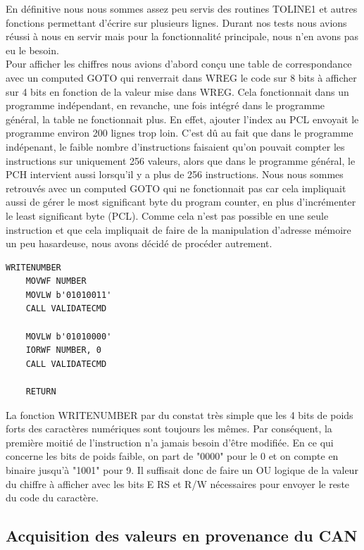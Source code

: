 \documentclass[a4paper,11pt,titlepage]{article}
\begin{document}
En définitive nous nous sommes assez peu servis des routines TOLINE1 et autres fonctions permettant d'écrire sur plusieurs lignes. Durant nos tests nous avions réussi à nous en servir mais pour la fonctionnalité principale, nous n'en avons pas eu le besoin.\\

Pour afficher les chiffres nous avions d'abord conçu une table de correspondance avec un computed GOTO qui renverrait dans WREG le code sur 8 bits à afficher sur 4 bits en fonction de la valeur mise dans WREG. Cela fonctionnait dans un programme indépendant, en revanche, une fois intégré dans le programme général, la table ne fonctionnait plus. En effet, ajouter l'index au PCL envoyait le programme environ 200 lignes trop loin. C'est dû au fait que dans le programme indépenant, le faible nombre d'instructions faisaient qu'on pouvait compter les instructions sur uniquement 256 valeurs, alors que dans le programme général, le PCH intervient aussi lorsqu'il y a plus de 256 instructions. Nous nous sommes retrouvés avec un computed GOTO qui ne fonctionnait pas car cela impliquait aussi de gérer le most significant byte du program counter, en plus d'incrémenter le least significant byte (PCL). Comme cela n'est pas possible en une seule instruction et que cela impliquait de faire de la manipulation d'adresse mémoire un peu hasardeuse, nous avons décidé de procéder autrement.\\

\begin{lstlisting}
WRITENUMBER
    MOVWF NUMBER
    MOVLW b'01010011'
    CALL VALIDATECMD
    
    MOVLW b'01010000'
    IORWF NUMBER, 0
    CALL VALIDATECMD
    
    RETURN	    
\end{lstlisting}

La fonction WRITENUMBER par du constat très simple que les 4 bits de poids forts des caractères numériques sont toujours les mêmes. Par conséquent, la première moitié de l'instruction n'a jamais besoin d'être modifiée. En ce qui concerne les bits de poids faible, on part de "0000" pour le 0 et on compte en binaire jusqu'à "1001" pour 9. Il suffisait donc de faire un OU logique de la valeur du chiffre à afficher avec les bits E RS et R/W nécessaires pour envoyer le reste du code du caractère.

\subsection{Acquisition des valeurs en provenance du CAN}
\end{document}
